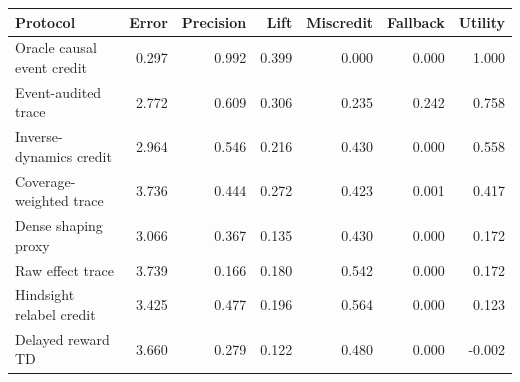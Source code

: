 \begin{tabular}{lrrrrrr}
\toprule
Protocol & Error & Precision & Lift & Miscredit & Fallback & Utility \\
\midrule
Oracle causal event credit & 0.297 & 0.992 & 0.399 & 0.000 & 0.000 & 1.000 \\
Event-audited trace & 2.772 & 0.609 & 0.306 & 0.235 & 0.242 & 0.758 \\
Inverse-dynamics credit & 2.964 & 0.546 & 0.216 & 0.430 & 0.000 & 0.558 \\
Coverage-weighted trace & 3.736 & 0.444 & 0.272 & 0.423 & 0.001 & 0.417 \\
Dense shaping proxy & 3.066 & 0.367 & 0.135 & 0.430 & 0.000 & 0.172 \\
Raw effect trace & 3.739 & 0.166 & 0.180 & 0.542 & 0.000 & 0.172 \\
Hindsight relabel credit & 3.425 & 0.477 & 0.196 & 0.564 & 0.000 & 0.123 \\
Delayed reward TD & 3.660 & 0.279 & 0.122 & 0.480 & 0.000 & -0.002 \\
\bottomrule
\end{tabular}
